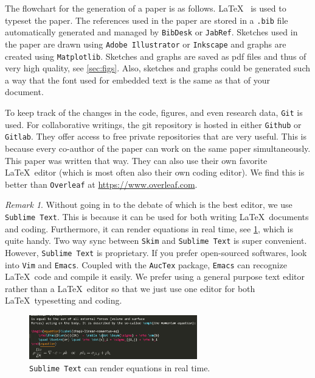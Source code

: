\documentclass[authoryear,3p,times,preprint,review,fleqn]{elsarticle}
\numberwithin{equation}{section}
\theoremstyle{remark}
\newtheorem{rmk}{Remark}
\begin{document}
The flowchart for the generation of a paper is as follows. \LaTeX~ is used to typeset the paper. The references used in the paper are stored in a \texttt{.bib} file automatically generated and managed by \texttt{BibDesk} or \texttt{JabRef}. Sketches used in the paper are drawn using \texttt{Adobe Illustrator} or \texttt{Inkscape} and graphs are created using \texttt{Matplotlib}. Sketches and graphs are saved as pdf files and thus of very high quality, see \cref{sec:figs}. Also, sketches and graphs could be generated such a way that the font used for embedded text is the same as that of your document.

To keep track of the changes in the code, figures, and even research data, \texttt{Git} is used. For collaborative writings, the git repository is hosted in either \texttt{Github} or \texttt{Gitlab}. They offer access to free private repositories that are very useful. This is because every co-author of the paper can work on the same paper simultaneously. This paper was written that way. 
They can also use their own favorite \LaTeX\ editor (which is most often also their own coding editor). We find this is better than \texttt{Overleaf} at \url{https://www.overleaf.com}.




\begin{rmk}\label{rm:a}
Without going in to the debate of which is the best editor, we use \texttt{Sublime Text}. This is
because it can be used for both writing \LaTeX\ documents and coding. Furthermore, it can render equations in real time, see  \cref{fig:sublime-text}, which is quite handy. Two way sync between \texttt{Skim} and \texttt{Sublime Text} is super convenient. However, \texttt{Sublime Text} is proprietary. If you prefer open-sourced softwares, look into \texttt{Vim} and \texttt{Emacs}. Coupled with the \texttt{AucTex} package, \texttt{Emacs} can recognize \LaTeX\ code and compile it easily. We prefer using a general purpose text editor rather than a \LaTeX\ editor so that we just use one editor  for both \LaTeX\ typesetting and coding. 

\begin{figure}[h!]
  \centering 
   \includegraphics[width=0.65\textwidth]{sublime-text}
   \caption{\texttt{Sublime Text} can render equations in real time.}
\label{fig:sublime-text}
\end{figure}
\end{rmk}
\end{document}
